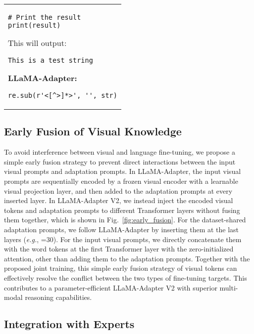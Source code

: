 \documentclass[10pt,twocolumn,letterpaper]{article}
\begin{document}
\begin{table*}[th]
\begin{tabular}{p{}}
\begin{framed}
\begin{minipage}{\textwidth}
\begin{lstlisting}
# Print the result
print(result)
\end{lstlisting}

This will output:

\begin{lstlisting}
This is a test string
\end{lstlisting}
{\bf LLaMA-Adapter:} 
\begin{lstlisting}
re.sub(r'<[^>]*>', '', str)
\end{lstlisting}
\end{minipage}
\end{framed}

\end{tabular}\vspace{-5mm}
\caption{\textbf{Comparisons of Instruction-following Ability} between LLaMA-Adapter V2 and LLaMA-Adapter.}
\label{tab:language_instruction_comparison}
\end{table*} 
\vspace{0.2cm}
\subsection{Early Fusion of Visual Knowledge}
\label{subsec:early_fusion}
To avoid interference between visual and language fine-tuning, we propose a simple early fusion strategy to prevent direct interactions between the input visual prompts and adaptation prompts.
In LLaMA-Adapter, the input visual prompts are sequentially encoded by a frozen visual encoder with a learnable visual projection layer, and then added to the adaptation prompts at every inserted layer.
In LLaMA-Adapter V2, we instead inject the encoded visual tokens and adaptation prompts to different Transformer layers without fusing them together, which is shown in Fig.~\ref{fig:early_fusion}. For the dataset-shared adaptation prompts, we follow LLaMA-Adapter by inserting them at the last  layers (\emph{e.g.}, =30). For the input visual prompts, we directly concatenate them with the word tokens at the first Transformer layer with the zero-initialized attention, other than adding them to the adaptation prompts. Together with the proposed joint training, this simple early fusion strategy of visual tokens can effectively resolve the conflict between the two types of fine-tuning targets. This contributes to a parameter-efficient LLaMA-Adapter V2 with superior multi-modal reasoning capabilities.

\vspace{0.2cm}
\subsection{Integration with Experts}
\label{subsec:with_experts}
\end{document}
